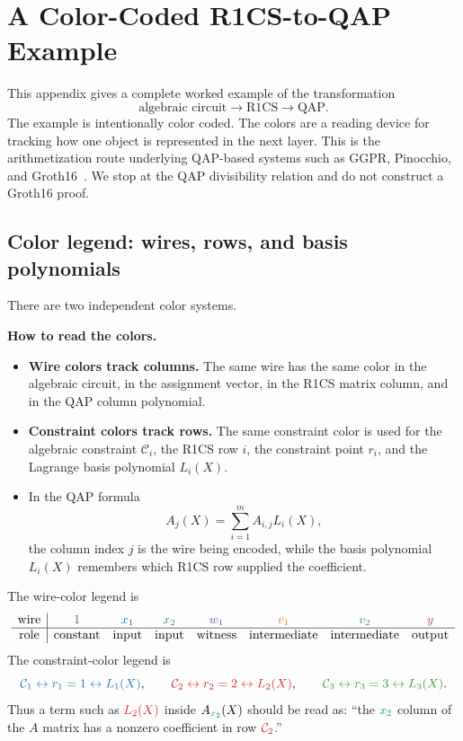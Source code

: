 ﻿\section{A Color-Coded R1CS-to-QAP Example}
\label{app:r1cs-qap-example}

This appendix gives a complete worked example of the transformation
\[
    \text{algebraic circuit}\longrightarrow \text{R1CS}\longrightarrow \text{QAP}.
\]
The example is intentionally color coded. The colors are a reading device for tracking how one object is represented in the next layer. This is the arithmetization route underlying QAP-based systems such as GGPR, Pinocchio, and Groth16~\cite{GennaroGentryParnoRaykova2013,ParnoHowellGentryRaykova2013,Groth2016}. We stop at the QAP divisibility relation and do not construct a Groth16 proof.

\subsection{Color legend: wires, rows, and basis polynomials}

There are two independent color systems.

\begin{tcolorbox}
\textbf{How to read the colors.}
\begin{itemize}[leftmargin=2em]
    \item \textbf{Wire colors track columns.} The same wire has the same color in the algebraic circuit, in the assignment vector, in the R1CS matrix column, and in the QAP column polynomial.
    \item \textbf{Constraint colors track rows.} The same constraint color is used for the algebraic constraint $\mathcal C_i$, the R1CS row $i$, the constraint point $r_i$, and the Lagrange basis polynomial $L_i(X)$.
    \item In the QAP formula
    \[
        A_j(X)=\sum_{i=1}^{m} A_{i,j} L_i(X),
    \]
    the column index $j$ is the wire being encoded, while the basis polynomial $L_i(X)$ remembers which R1CS row supplied the coefficient.
\end{itemize}
\end{tcolorbox}

The wire-color legend is
\[
\begin{array}{c|ccccccc}
\text{wire} & \constwire{1} & \xone{x_1} & \xtwo{x_2} & \wone{w_1} & \vone{v_1} & \vtwo{v_2} & \ywire{y} \\
\hline
\text{role} & \text{constant} & \text{input} & \text{input} & \text{witness} & \text{intermediate} & \text{intermediate} & \text{output}
\end{array}
\]
The constraint-color legend is
\[
    \rowone{\mathcal C_1\leftrightarrow r_1=1\leftrightarrow L_1(X)},
    \qquad
    \rowtwo{\mathcal C_2\leftrightarrow r_2=2\leftrightarrow L_2(X)},
    \qquad
    \rowthree{\mathcal C_3\leftrightarrow r_3=3\leftrightarrow L_3(X)}.
\]
Thus a term such as $\rowtwo{L_2(X)}$ inside $A_{\xtwo{x_2}}(X)$ should be read as: ``the $\xtwo{x_2}$ column of the $A$ matrix has a nonzero coefficient in row $\rowtwo{\mathcal C_2}$.''

